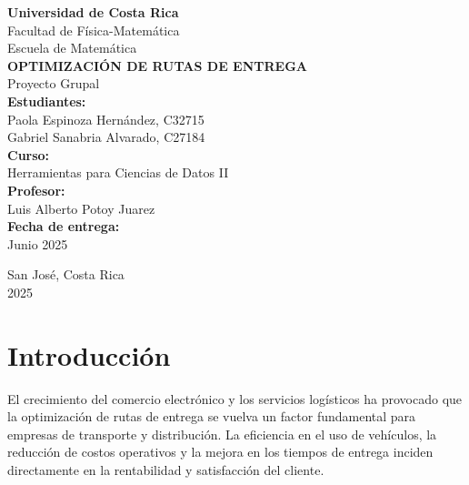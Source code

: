 \documentclass[a4paper,12pt]{article}
\begin{document}
\begin{titlepage}
    \begin{center}
        \vspace*{1.8cm}
        
        {\Large\textbf{Universidad de Costa Rica}}\\[0.5cm]
        {\large Facultad de Física-Matemática}\\
        {\large Escuela de Matemática}\\[2cm]
        
        {\LARGE\bfseries OPTIMIZACIÓN DE RUTAS DE ENTREGA}\\[0,5cm]
        {\large Proyecto Grupal}\\[2cm]
        
        \textbf{Estudiantes:}\\
        Paola Espinoza Hernández, C32715\\
        Gabriel Sanabria Alvarado, C27184\\[0.5cm]
        
        \textbf{Curso:}\\
        Herramientas para Ciencias de Datos II\\[0.5cm]
        
        \textbf{Profesor:}\\
        Luis Alberto Potoy Juarez\\[2cm]
        
        \textbf{Fecha de entrega:}\\
        Junio 2025
        
        \vfill
        
        {\large San José, Costa Rica}\\
        {\large 2025}
    \end{center}
\end{titlepage}

\fontsize{11}{13}\selectfont %
\onehalfspacing             %


\newpage

\section{Introducción}
El crecimiento del comercio electrónico y los servicios logísticos ha provocado que la optimización de rutas de entrega se vuelva un factor fundamental para empresas de transporte y distribución. La eficiencia en el uso de vehículos, la reducción de costos operativos y la mejora en los tiempos de entrega inciden directamente en la rentabilidad y satisfacción del cliente.
\end{document}
